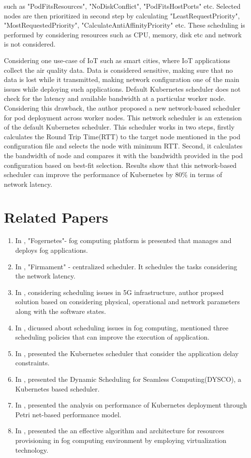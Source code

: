\documentclass[12pt,twoside,doublepage]{article}
\begin{document}
such as "PodFitsResources", "NoDiskConflict", "PodFitsHostPorts" etc. Selected nodes are then prioritized
in second step by calculating "LeastRequestPriority", "MostRequestedPriority", "CalculateAntiAffinityPriority"
etc. These scheduling is performed by considering resources such as CPU, memory, disk etc and network is not
considered.
\par
Considering one use-case of IoT such as smart cities, where IoT applications collect the air quality data. Data is
considered sensitive, making sure that no data is lost while it transmitted, making network configuration one of the
main issues while deploying such applications. Default Kubernetes scheduler does not check for the latency and available bandwidth
at a particular worker node. Considering this drawback, the author proposed a new network-based scheduler for pod deployment
across worker nodes. This network scheduler is an extension of the default Kubernetes scheduler. This scheduler works
in two steps, firstly calculates the Round Trip Time(RTT) to the target node mentioned in the pod configuration file
and selects the node with minimum RTT. Second, it calculates the bandwidth of node and compares it with the bandwidth
provided in the pod configuration based on best-fit selection. Results show that this network-based scheduler can
improve the performance of Kubernetes by 80\% in terms of network latency\cite{Santos2019}.

\section{Related Papers}
\label{sec:relwork}
\begin{enumerate}
  \item In \cite{Wobker2018}, "Fogernetes"- fog computing platform is presented that manages and deploys fog applications.
  \item In \cite{gog}, "Firmament" - centralized scheduler. It schedules the tasks considering the network latency.
  \item In \cite{MichaelChimaOgbuachiAnnaRealePeterSuskovics}, considering scheduling issues in 5G infrastructure, author
  propsed solution based on considering physical, operational and network parameters along with the software states.
  \item In \cite{Bittencourt2017}, dicussed about scheduling issues in fog computing, mentioned three scheduling policies
  that can improve the execution of application.
  \item In \cite{Haja2019}, presented the Kubernetes scheduler that consider the application delay constraints.
  \item In \cite{Mittermeier2018}, presented the Dynamic Scheduling for Seamless Computing(DYSCO), a Kubernetes based scheduler.
  \item In \cite{Medel2018}, presented the analysis on performance of Kubernetes deployment through Petri net-based performance model.
  \item In \cite{Agarwal2016}, presented the  an effective algorithm and architecture for resources provisioning in fog computing
  environment by employing virtualization technology.
\end{enumerate}
\end{document}

